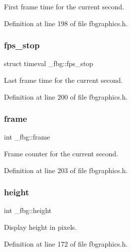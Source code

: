 First frame time for the current second. 



Definition at line 198 of file fbgraphics.\+h.

\mbox{\label{struct__fbg_ade17a45bbc82bef326857c2837cdf66c}} 
\subsubsection{\texorpdfstring{fps\+\_\+stop}{fps\_stop}}
{\footnotesize\ttfamily struct timeval \+\_\+fbg\+::fps\+\_\+stop}



Last frame time for the current second. 



Definition at line 200 of file fbgraphics.\+h.

\mbox{\label{struct__fbg_aa3ef83f919d12e680f8c64006b441454}} 
\subsubsection{\texorpdfstring{frame}{frame}}
{\footnotesize\ttfamily int \+\_\+fbg\+::frame}



Frame counter for the current second. 



Definition at line 203 of file fbgraphics.\+h.

\mbox{\label{struct__fbg_a3a3bd409e71d020fa77f69a541d832f8}} 
\subsubsection{\texorpdfstring{height}{height}}
{\footnotesize\ttfamily int \+\_\+fbg\+::height}



Display height in pixels. 



Definition at line 172 of file fbgraphics.\+h.

\mbox{\label{struct__fbg_ac9a25b7b2700bee151d8f9dc3e586487}} 
